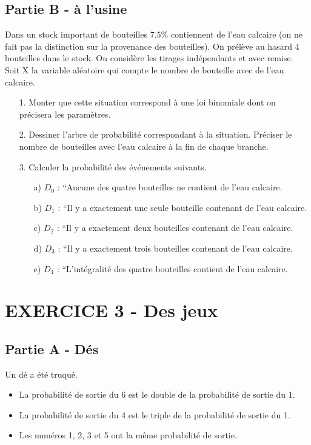 \documentclass[12pt]{article}
\begin{document}
\subsection*{Partie B - à l'usine}

Dans un stock important de bouteilles $7.5\%$ contiennent de l'eau calcaire (on ne fait pas la distinction sur la provenance des bouteilles). On prélève au hasard 4 bouteilles dans le stock. On considère les tirages indépendants et avec remise. Soit X la variable aléatoire qui compte le nombre de bouteille avec de l'eau calcaire.

\begin{enumerate}
\item[1.]  Monter que cette situation correspond à une loi binomiale dont on précisera les paramètres.
\item[2.] Dessiner l'arbre de probabilité correspondant à la situation. Préciser le nombre de bouteilles avec l'eau calcaire à la fin de chaque branche.
\item[3.] Calculer la probabilité des événements suivants.
  \begin{enumerate}
  \item[a)] $D_0$ : ``Aucune des quatre bouteilles ne contient de l'eau calcaire.
  \item[b)] $D_1$ : ``Il y a exactement une seule bouteille contenant de l'eau calcaire.
  \item[c)] $D_2$ : ``Il y a exactement deux bouteilles contenant de l'eau calcaire.
  \item[d)] $D_3$ : ``Il y a exactement trois bouteilles contenant de l'eau calcaire.
  \item[e)] $D_4$ : ``L'intégralité des quatre bouteilles contient de l'eau calcaire.
  \end{enumerate}
\end{enumerate}

\newpage
\section*{EXERCICE 3 - Des jeux} %

\subsection*{Partie A - Dés}

Un dé a été truqué.
\begin{itemize}
\item La probabilité de sortie du 6 est le double de la probabilité de sortie du 1. 
\item La probabilité de sortie du 4 est le triple de la probabilité de sortie du 1.
\item Les numéros 1, 2, 3 et 5 ont la même probabilité de sortie.
\end{itemize}
\end{document}
